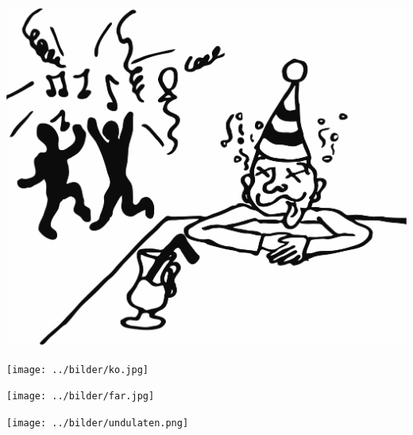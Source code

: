 \begin{intersong}
\sffamily\bfseries\LARGE{}
\begin{center}
	\vspace{10mm}
\includegraphics[width=1\textwidth]{../bilder/fardigabilder/BilderTillKapitel/jagvarfull.png} 
\end{center}
\end{intersong}
\sclearpage

\begin{intersong}
\begin{center}
\texttt{[image: ../bilder/ko.jpg]} 
\end{center}
\end{intersong}
\sclearpage


\sclearpage

\sclearpage
%
\sclearpage


\begin{intersong}
\begin{center}
\texttt{[image: ../bilder/far.jpg]} 
\end{center}
\end{intersong}
\sclearpage


\sclearpage



\sclearpage

\sclearpage

\begin{intersong}
\begin{center}
\texttt{[image: ../bilder/undulaten.png]} 
\end{center}
\end{intersong}
